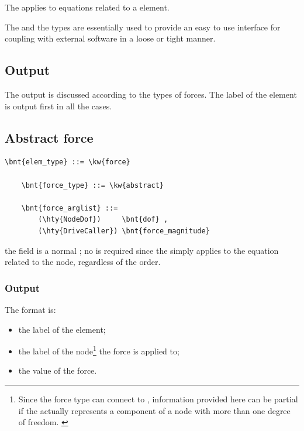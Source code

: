 The   applies to equations related
to a  element.

The  and the  types
are essentially used to provide an easy to use interface
for coupling with external software in a loose or tight manner.

\subsection{Output}
The output is discussed according to the types of forces. 
The label of the element is output first in all the cases.

\subsection{Abstract force}\label{sec:EL:FORCE:ABSTRACT}
\begin{Verbatim}[commandchars=\\\{\}]
    \bnt{elem_type} ::= \kw{force}

    \bnt{force_type} ::= \kw{abstract}

    \bnt{force_arglist} ::=
        (\hty{NodeDof})     \bnt{dof} ,
        (\hty{DriveCaller}) \bnt{force_magnitude}
\end{Verbatim}
the  field is a normal ; no  is required
since the  simply applies to the equation related to the node,
regardless of the order.

\subsubsection{Output}
The format is:
\begin{itemize}
    \item the label of the element;
    \item the label of the node\footnote{Since the  force type
	can connect to , information provided here
	can be partial if the  actually represents
	a component of a node with more than one degree of freedom.
	\label{footnote:EL:FORCE:ABSTRACT:OUTPUT:node_dof}}
	the force is applied to;
    \item the value of the force.
\end{itemize}

